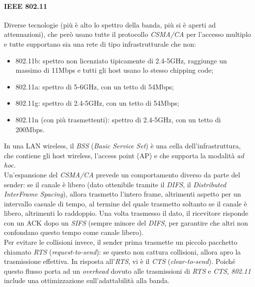 \paragraph{IEEE 802.11}
Diverse tecnologie (più è alto lo spettro della banda, più si è aperti ad attenuazioni), che però usano tutte il protocollo \textit{CSMA/CA} per l'accesso multiplo e tutte supportano sia una rete di tipo infrastrutturale che non:
\begin{itemize}
	\item 802.11b: spettro non licenziato tipicamente di 2.4-5GHz, raggiunge un massimo di 11Mbps e tutti gli host usano lo stesso chipping code;
	\item 802.11a: spettro di 5-6GHz, con un tetto di 54Mbps;
	\item 802.11g: spettro di 2.4-5GHz, con un tetto di 54Mbps;
	\item 802.11n (con più trasmettenti): spettro di 2.4-5GHz, con un tetto di 200Mbps.
\end{itemize}

In una LAN wireless, il \textit{BSS} (\textit{Basic Service Set}) è una cella dell'infrastruttura, che contiene gli host wireless, l'access point (AP) e che supporta la modalità \textit{ad hoc}. \\
Un'espansione del \textit{CSMA/CA} prevede un comportamento diverso da parte del sender: se il canale è libero (dato ottenibile tramite il \textit{DIFS}, il \textit{Distributed InterFrame Spacing}), allora trasmetto l'intero frame, altrimenti aspetto per un intervallo casuale di tempo, al termine del quale trasmetto soltanto se il canale è libero, altrimenti lo raddoppio. Una volta trasmesso il dato, il ricevitore risponde con un ACK dopo un \textit{SIFS} (sempre minore del \textit{DIFS}, per garantire che altri non confondano questo tempo come canale libero). \\
Per evitare le collisioni invece, il sender prima trasmette un piccolo pacchetto chiamato \textit{RTS} (\textit{request-to-send}): se questo non cattura collisioni, allora apro la trasmissione effettiva. In risposta all'\textit{RTS}, vi è il \textit{CTS} (\textit{clear-to-send}).
Poiché questo flusso porta ad un \textit{overhead} dovuto alle trasmissioni di \textit{RTS} e \textit{CTS}, \textit{802.11} include una ottimizzazione sull'adattabilità alla banda.

